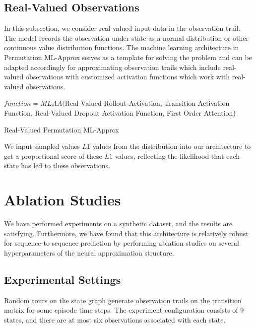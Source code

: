 \documentclass[10pt, conference, compsocconf]{IEEEtran}
\begin{document}
\subsection{Real-Valued Observations}
In this subsection, we consider real-valued input data in the observation trail. The model records the observation under state as a normal distribution or other continuous value distribution functions. The machine learning architecture in {\sc Permutation ML-Approx} serves as a template for solving the problem and can be adapted accordingly for approximating observation trails which include real-valued observations with customized activation functions which work with real-valued observations.

\begin{algorithm}[h]

$function = MLAA(${\sc Real-Valued Rollout Activation}, {\sc Transition Activation Function}, {\sc Real-Valued Dropout Activation Function}, {\sc First Order Attention}) \;
\caption{{\sc Real-Valued Permutation ML-Approx}}
\label{algo:arch_template2}
\end{algorithm}



We input sampled values $L1$ values from the distribution into our architecture to get a proportional score of these $L1$ values, reflecting the likelihood that each state has led to these observations.

\section{Ablation Studies}
We have performed experiments on a synthetic dataset, and the results are satisfying. Furthermore, we have found that this architecture is relatively robust for sequence-to-sequence prediction by performing ablation studies on several hyperparameters of the neural approximation structure. 
\subsection{Experimental Settings}
 Random tours on the state graph generate observation trails on the transition matrix for some episode time steps. The experiment configuration consists of 9 states, and there are at most six observations associated with each state.
\end{document}
